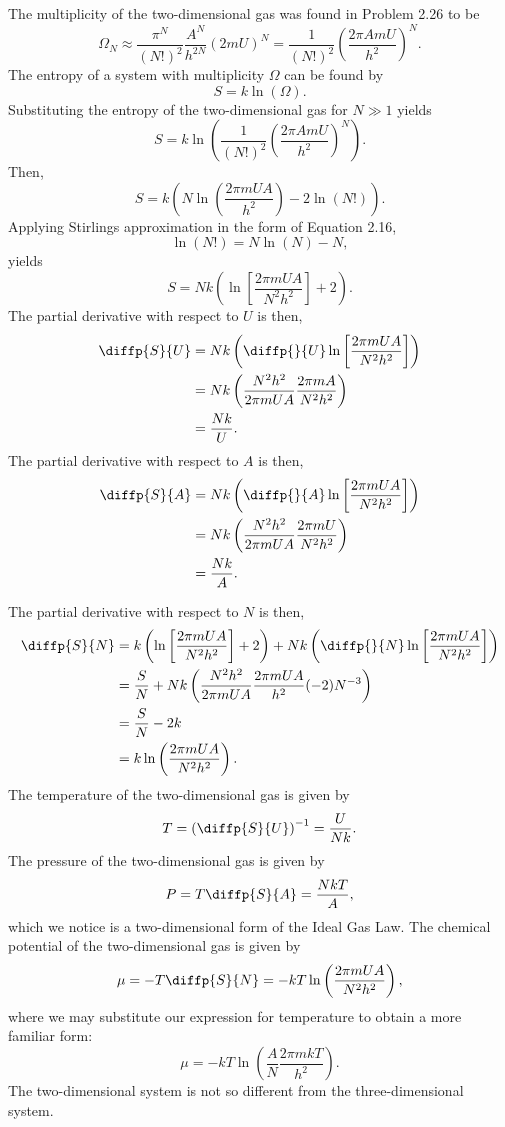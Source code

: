 \documentclass[a4paper, 12pt]{config/homework}
\begin{document}
\bigskip
\noindent
The multiplicity of the two-dimensional gas was found in Problem 2.26 to be
\[\Omega_N
\approx \frac{\pi^N}{(N!)^2}\frac{A^N}{h^{2N}}\left(2mU\right)^N
= \frac{1}{(N!)^2} \left(\frac{2\pi A m U}{h^2}\right)^N .\]
The entropy of a system with multiplicity \(\Omega\) can be found by
\[S = k\ln\left(\Omega\right).\]
Substituting the entropy of the two-dimensional gas for \(N\gg 1\) yields
\[S = k\ln\left(\frac{1}{(N!)^2} \left(\frac{2\pi A m U}{h^2}\right)^N\right).\]
Then,
\[S = k\left(N\ln\left(\frac{2\pi mUA}{h^2}\right) - 2\ln\left(N!\right)\right).\]
Applying Stirlings approximation in the form of Equation 2.16,
\[\ln(N!) = N\ln(N) - N,\]
yields
\[S = Nk\left(\ln\left[\frac{2\pi mUA}{N^2h^2}\right] + 2\right).\]
The partial derivative with respect to \(U\) is then,
\begin{align*}
\diffp{S}{U} &= Nk\left(\diffp{}{U}\ln\left[\frac{2\pi m U A}{N^2 h^2}\right]\right)
\\&= Nk \left(\frac{N^2 h^2}{2\pi m U A}\frac{2 \pi m A}{N^2 h^2}\right)
\\&= \frac{Nk}{U}.
\end{align*}
The partial derivative with respect to \(A\) is then,
\begin{align*}
\diffp{S}{A} &= Nk\left(\diffp{}{A}\ln\left[\frac{2 \pi m U A}{N^2 h^2}\right]\right)
\\&= Nk \left(\frac{N^2 h^2}{2 \pi m U A}\frac{2 \pi m U}{N^2 h^2}\right)
\\&= \frac{Nk}{A}.
\end{align*}

\pagebreak\noindent
The partial derivative with respect to \(N\) is then,
\begin{align*}
\diffp{S}{N} &= k\left(\ln\left[\frac{2\pi m U A}{N^2 h^2}\right] + 2\right) + Nk\left(\diffp{}{N}\ln\left[\frac{2 \pi m U A}{N^2 h^2}\right]\right)
\\&= \frac{S}{N} + Nk\left(\frac{N^2 h^2}{2\pi m U A}\frac{2\pi m U A}{h^2} (-2)N^{-3}\right)
\\&= \frac{S}{N} - 2k
\\&= k\ln\left(\frac{2\pi m U A}{N^2 h^2}\right).
\end{align*}
The temperature of the two-dimensional gas is given by
\[T = \left(\diffp{S}{U}\right)^{-1} = \frac{U}{Nk}.\]
The pressure of the two-dimensional gas is given by
\[P = T\diffp{S}{A} = \frac{NkT}{A},\]
which we notice is a two-dimensional form of the Ideal Gas Law.
The chemical potential of the two-dimensional gas is given by
\[\mu = -T\diffp{S}{N} = -kT\ln\left(\frac{2\pi m U A}{N^2 h^2}\right),\]
where we may substitute our expression for temperature to obtain a more familiar form:
\[\mu = -kT\ln\left(\frac{A}{N}\frac{2\pi m k T}{h^2}\right).\]
The two-dimensional system is not so different from the three-dimensional system.
\end{document}
